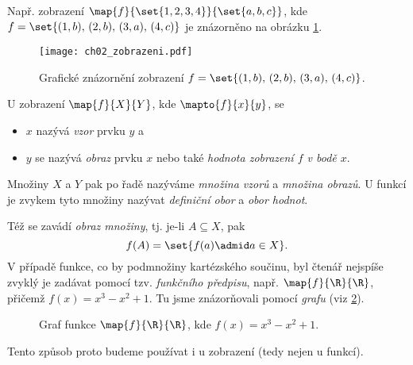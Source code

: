 Např. zobrazení $\map{f}{\set{1,2,3,4}}{\set{a,b,c}}$, kde $f=\set{(1,b),\,(2,b),\,(3,a),\,(4,c)}$ je znázorněno na obrázku \ref{fig:zobrazeni}.
\begin{figure}[h]
    \centering
    \texttt{[image: ch02\_zobrazeni.pdf]}
    \caption{Grafické znázornění zobrazení $f=\set{(1,b),\,(2,b),\,(3,a),\,(4,c)}$.}
    \label{fig:zobrazeni}
\end{figure}
U zobrazení $\map{f}{X}{Y}$, kde $\mapto{f}{x}{y}$, se
\begin{itemize}
    \item $x$ nazývá \emph{vzor} prvku $y$ a
    \item $y$ se nazývá \emph{obraz} prvku $x$ nebo také \emph{hodnota zobrazení $f$ v bodě $x$}.
\end{itemize}
Množiny $X$ a $Y$ pak po řadě nazýváme \emph{množina vzorů} a \emph{množina obrazů}. U funkcí je zvykem tyto množiny nazývat \emph{definiční obor} a \emph{obor hodnot}.\par
Též se zavádí \emph{obraz množiny}, tj. je-li $A\subseteq X$, pak
\begin{equation*}
    f(A)=\set{f(a) \admid a\in X}.
\end{equation*}
V případě funkce, co by podmnožiny kartézského součinu, byl čtenář nejspíše zvyklý je zadávat pomocí tzv. \emph{funkčního předpisu}, např. $\map{f}{\R}{\R}$, přičemž $f(x)=x^3-x^2+1$. Tu jsme znázorňovali pomocí \emph{grafu} (viz \ref{fig:funkce_graf}).
\begin{figure}[h]
    \centering
    
    \caption{Graf funkce $\map{f}{\R}{\R}$, kde $f(x)=x^3-x^2+1$.}
    \label{fig:funkce_graf}
\end{figure}
Tento způsob proto budeme používat i u zobrazení (tedy nejen u funkcí).

